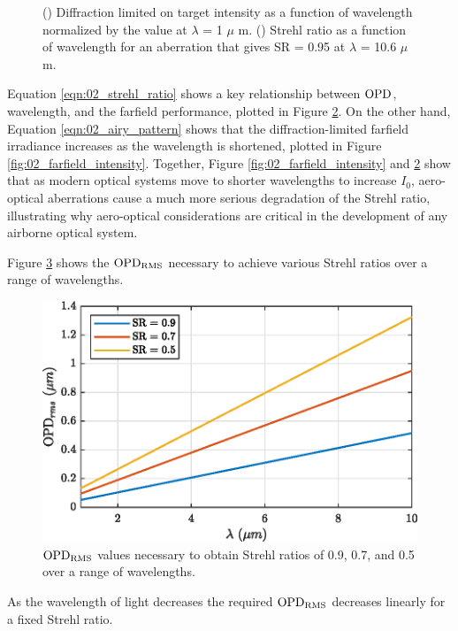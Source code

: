 \begin{figure}
\begin{subfigure}[t]{0.45\textwidth}
    \caption{}\label{fig:02_all_strehl_ratio}
  \end{subfigure}
  \caption{() Diffraction limited on target intensity as a function of wavelength normalized by the value at $\lambda$ = 1 $\mu$ m. () Strehl ratio as a function of wavelength for an aberration that gives SR = 0.95 at $\lambda$ = 10.6 $\mu$m.}
\end{figure}
Equation \ref{eqn:02_strehl_ratio} shows a key relationship between $\operatorname{OPD}$, wavelength, and the farfield performance, plotted in Figure \ref{fig:02_all_strehl_ratio}.
On the other hand, Equation \ref{eqn:02_airy_pattern} shows that the diffraction-limited farfield irradiance increases as the wavelength is shortened, plotted in Figure \ref{fig:02_farfield_intensity}.
Together, Figure \ref{fig:02_farfield_intensity} and \ref{fig:02_all_strehl_ratio} show that as modern optical systems move to shorter wavelengths to increase $I_0$, aero-optical aberrations cause a much more serious degradation of the Strehl ratio, illustrating why aero-optical considerations are critical in the development of any airborne optical system.

Figure \ref{fig:02_necessary_opd} shows the $\operatorname{OPD_{RMS}}$ necessary to achieve various Strehl ratios over a range of wavelengths.
\begin{figure}
  \centering
  \includegraphics{../matlab/02_background/necessary_opd.eps}
  \caption{$\operatorname{OPD_{RMS}}$ values necessary to obtain Strehl ratios of 0.9, 0.7, and 0.5 over a range of wavelengths.}
  \label{fig:02_necessary_opd}
\end{figure}
As the wavelength of light decreases the required $\operatorname{OPD_{RMS}}$ decreases linearly for a fixed Strehl ratio.


